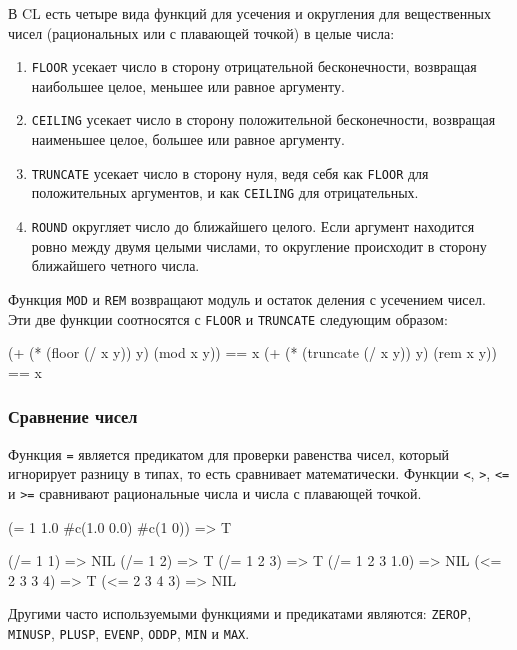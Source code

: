 В CL есть четыре вида функций для усечения и округления для вещественных чисел (рациональных или с плавающей точкой) в целые числа:
\begin{enumerate}
  \item \lstinline{FLOOR} усекает число в сторону отрицательной бесконечности, возвращая наибольшее целое, меньшее или равное аргументу.
  \item \lstinline{CEILING} усекает число в сторону положительной бесконечности, возвращая наименьшее целое, большее или равное аргументу.
  \item \lstinline{TRUNCATE} усекает число в сторону нуля, ведя себя как \lstinline{FLOOR} для положительных аргументов, и как \lstinline{CEILING} для отрицательных.
  \item \lstinline{ROUND} округляет число до ближайшего целого. Если аргумент находится ровно между двумя целыми числами, то округление происходит в сторону ближайшего четного числа.
\end{enumerate}

Функция \lstinline{MOD} и \lstinline{REM} возвращают модуль и остаток деления с усечением чисел. Эти две функции соотносятся с \lstinline{FLOOR} и \lstinline{TRUNCATE} следующим образом:
\begin{cllst}{}{}
(+ (* (floor    (/ x y)) y) (mod x y)) == x
(+ (* (truncate (/ x y)) y) (rem x y)) == x
\end{cllst}

\subsubsection{Сравнение чисел}
Функция \lstinline{=} является предикатом для проверки равенства чисел, который игнорирует разницу в типах, то есть сравнивает математически. Функции \lstinline{<}, \lstinline{>}, \lstinline{<=} и \lstinline{>=} сравнивают рациональные числа и числа с плавающей точкой.
\begin{cllst}{}{}
(= 1 1.0 #c(1.0 0.0) #c(1 0))  => T

(/= 1 1)     => NIL    (/= 1 2)       => T
(/= 1 2 3)   => T      (/= 1 2 3 1.0) => NIL
(<= 2 3 3 4) => T      (<= 2 3 4 3)   => NIL
\end{cllst}

Другими часто используемыми функциями и предикатами являются: \lstinline{ZEROP}, \lstinline{MINUSP}, \lstinline{PLUSP}, \lstinline{EVENP}, \lstinline{ODDP}, \lstinline{MIN} и \lstinline{MAX}.

